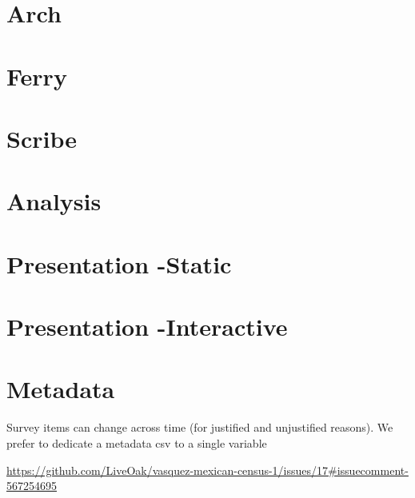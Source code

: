 \documentclass[
]{book}
\begin{document}
\hypertarget{pattern-arch}{%
\section{Arch}\label{pattern-arch}}

\hypertarget{pattern-ferry}{%
\section{Ferry}\label{pattern-ferry}}

\hypertarget{pattern-scribe}{%
\section{Scribe}\label{pattern-scribe}}

\hypertarget{pattern-analysis}{%
\section{Analysis}\label{pattern-analysis}}

\hypertarget{pattern-presentation-static}{%
\section{Presentation -Static}\label{pattern-presentation-static}}

\hypertarget{pattern-presentation-interactive}{%
\section{Presentation -Interactive}\label{pattern-presentation-interactive}}

\hypertarget{pattern-metadata}{%
\section{Metadata}\label{pattern-metadata}}

Survey items can change across time (for justified and unjustified reasons). We prefer to dedicate a metadata csv to a single variable

\url{https://github.com/LiveOak/vasquez-mexican-census-1/issues/17\#issuecomment-567254695}
\end{document}
